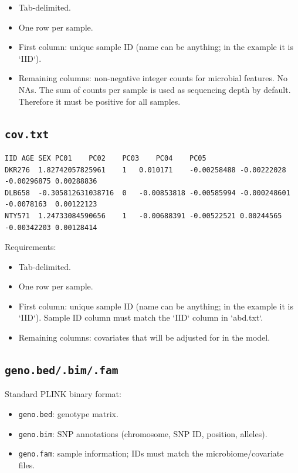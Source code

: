\documentclass[11pt]{article}
\begin{document}
\begin{itemize}[nosep]
  \item Tab-delimited.
  \item One row per sample.
  \item First column: unique sample ID (name can be anything; in the example it is `IID`).
  \item Remaining columns: non-negative integer counts for microbial features. 
  No NAs.
  The sum of counts per sample is used as sequencing depth by default. 
  Therefore it must be positive for all samples.
\end{itemize}

\subsection{\texttt{cov.txt}}
\begin{verbatim}
IID	AGE	SEX	PC01	PC02	PC03	PC04	PC05
DKR276	1.82742057825961	1	0.010171	-0.00258488	-0.00222028	-0.00296875	0.00288836
DLB658	-0.305812631038716	0	-0.00853818	-0.00585994	-0.000248601	-0.0078163	0.00122123
NTY571	1.24733084590656	1	-0.00688391	-0.00522521	0.00244565	-0.00342203	0.00128414
\end{verbatim}

Requirements:

\begin{itemize}[nosep]
  \item Tab-delimited.
  \item One row per sample.
  \item First column: unique sample ID (name can be anything; in the example it is `IID`). 
  Sample ID column must match the `IID` column in `abd.txt`.
  \item Remaining columns: covariates that will be adjusted for in the model.
\end{itemize}

\subsection{\texttt{geno.bed/.bim/.fam}}

Standard PLINK binary format:

\begin{itemize}[nosep]
  \item \texttt{geno.bed}: genotype matrix.
  \item \texttt{geno.bim}: SNP annotations (chromosome, SNP ID,
        position, alleles).
  \item \texttt{geno.fam}: sample information; IDs must match the
        microbiome/covariate files.
\end{itemize}
\end{document}
